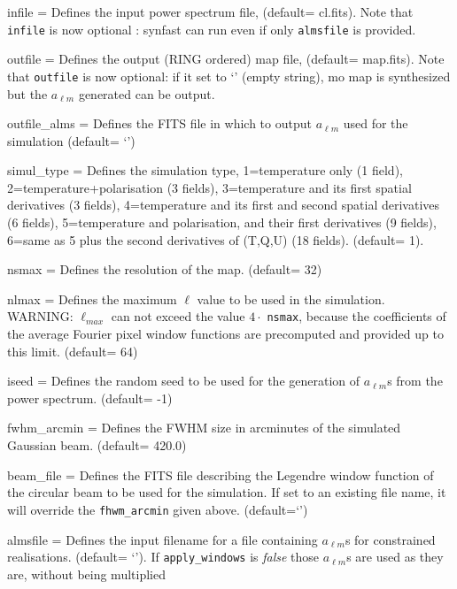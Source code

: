 \begin{qualifiers}
  \begin{qulistwide}{} %
    \item[{infile = }] Defines the input power spectrum file,
	(default= cl.fits). Note that {\tt infile} is now optional :
    synfast can run even if only {\tt almsfile} is provided.
    \item[{outfile = }] Defines the output (RING ordered) map file,
(default= map.fits). Note that {\tt outfile} is now optional: if it set to 
      `' (empty string),  mo map is synthesized but the $a_{\ell m}$ generated can be output.
    \item[{outfile\_alms = }] Defines the FITS file in which to output $a_{\ell m}$ used
      for the simulation (default= `')
     \item[{simul\_type = }] Defines the simulation type, 1=temperature only (1 field),
       2=temperature+polarisation (3 fields), 3=temperature and its first
spatial derivatives (3 fields),
       4=temperature and its first and second spatial derivatives (6 fields), 5=temperature
       and polarisation, and their first derivatives (9 fields), 6=same as 5
       plus the second derivatives of (T,Q,U) (18 fields).
(default= 1).
    \item[{nsmax = }] Defines the resolution of the map.
(default= 32)
     \item[{nlmax = }] Defines the maximum $\ell$ value 
to be used in the simulation. WARNING: $\ell_{max}$ can not exceed
the value $4\cdot$ {\tt nsmax}, because the coefficients of the  average Fourier 
pixel window functions
are precomputed and provided up to this limit.
(default= 64)
      \item[{iseed = }] Defines the random seed to be used 
for the generation of $a_{\ell m}$s from the power spectrum.
(default= -1)
    \item[{fwhm\_arcmin = }] Defines the FWHM size in arcminutes 
of the simulated Gaussian beam.
(default= 420.0)
%
    \item[{beam\_file = }] Defines the FITS file describing the
    Legendre window
    function of the circular beam to be used for the
    simulation. If set to an existing file name, it will override the
    {\tt fhwm\_arcmin} given above. (default=`')
%
     \item[{almsfile = }] Defines the input filename for a file
    containing $a_{\ell m}$s for constrained realisations. 
(default= `'). If {\tt apply\_windows} is {\em false} 
those $a_{\ell m}$s are used as they are, without being multiplied

\end{qulistwide}
\end{qualifiers}
